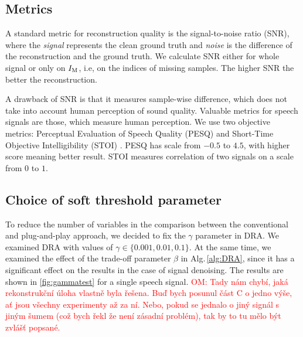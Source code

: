 \documentclass[conference]{IEEEtran}
\newcommand{\todo}[1]{\textcolor{red}{#1}}
\begin{document}
\subsection{Metrics}\label{subsec:metrics}


A standard metric for reconstruction quality is the signal-to-noise ratio (SNR), where the \textit{signal} represents the clean ground truth and \textit{noise} is the difference of the reconstruction and the ground truth.
We calculate SNR either for whole signal or only on $I_\textup{M}$, i.e, on the indices of missing samples.
The higher SNR the better the reconstruction.

A drawback of SNR is that it measures sample-wise difference, which does not take into account human perception of sound quality.
Valuable metrics for speech signals are those, which measure human perception.
We use two objective metrics: Perceptual Evaluation of Speech Quality (PESQ) \cite{Rix2001} and 
Short-Time Objective Intelligibility (STOI) \cite{Taal2010}.
PESQ has scale from $-0.5$ to $4.5$, with higher score meaning better result.
STOI measures correlation of two signals on a scale from $0$ to $1$.

\subsection{Choice of soft threshold parameter}\label{subsec:soft_thresh}

To reduce the number of variables in the comparison between the conventional and plug-and-play approach, we decided to fix the $\gamma$ parameter in DRA.
We examined DRA with values of $\gamma\in\{0.001, 0.01,0.1\}$.
At the same time, we examined the effect of the trade-off parameter $\beta$ in Alg.\,\ref{alg:DRA}, since it has a significant effect on the results in the case of signal denoising. 
The results are shown in \ref{fig:gammatest} for a single speech signal.
\todo{OM: Tady nám chybí, jaká rekonstrukční úloha vlastně byla řešena.
Buď bych posunul část C o jedno výše, ať jsou všechny experimenty až za ní.
Nebo, pokud se jednalo o jiný signál s jiným šumem (což bych řekl že není zásadní problém), tak by to tu mělo být zvlášť popsané.}
\end{document}
